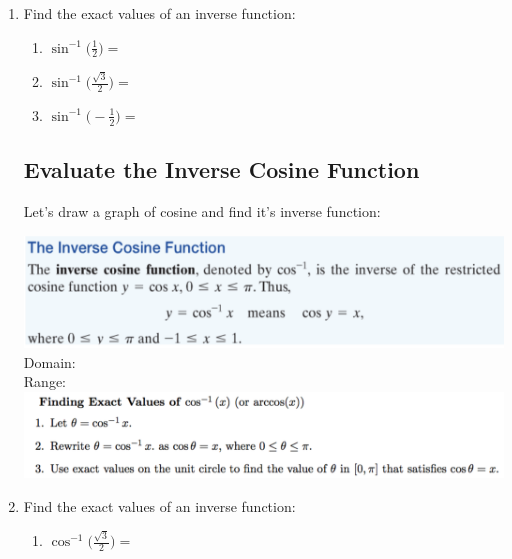 \begin{enumerate}
\vspace{-.1in}
\item Find the exact values of an inverse function:

\begin{enumerate} 
\item $\displaystyle \sin^{-1}\Bigg(\frac{1}{2}\Bigg)=$\\[.5in]

\item $\displaystyle \sin^{-1}\Bigg(\frac{\sqrt{3}}{2}\Bigg)=$\\[.5in]

\item $\displaystyle \sin^{-1}\Bigg(-\frac{1}{2}\Bigg)=$\\[.5in]
\end{enumerate}




\subsection{Evaluate the Inverse Cosine Function}

Let's draw a graph of cosine and find it's inverse function:
\vfill

\includegraphics[scale=.7]{cosineinverse}\\
\noindent Domain:\\[.5in]
\noindent Range:\\

\newpage
\includegraphics[scale=.7]{findingcosineinverse}\\




\vspace{-.1in}
\item Find the exact values of an inverse function:
 \begin{enumerate}
\item $\displaystyle \cos^{-1}\Bigg(\frac{\sqrt{3}}{2}\Bigg)=$\\[.5in]


\end{enumerate}
\end{enumerate}
